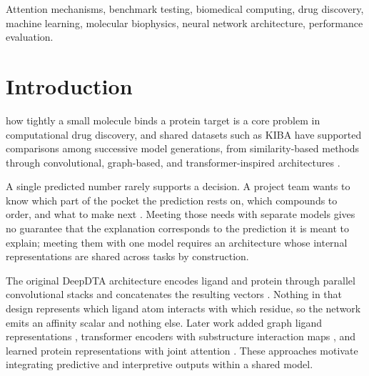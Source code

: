 \documentclass{ieeeaccess}
\begin{document}
\begin{keywords}
\raggedright
Attention mechanisms, benchmark testing, biomedical computing, drug discovery,
machine learning, molecular biophysics, neural network architecture,
performance evaluation.
\end{keywords}

\titlepgskip=-21pt
\maketitle

\section{Introduction}
 how tightly a small molecule binds a protein target
is a core problem in computational drug discovery, and shared datasets such as
KIBA have supported comparisons among successive model generations, from
similarity-based methods through convolutional, graph-based, and
transformer-inspired architectures
\cite{tang2014kiba,he2017simboost,pahikkala2015realistic,ozturk2018deepdta,ozturk2019widedta,karimi2019deepaffinity,tsubaki2019cpi,nguyen2021graphdta,huang2021moltrans,yang2022mgraphdta,huang2022fusiondta,bidgoli2026hmmdta,stepniewska2018pafnucy}.

A single predicted number rarely supports a decision. A project team wants to
know which part of the pocket the prediction rests on, which compounds to order,
and what to make next \cite{schneider2020rethinking}. Meeting those needs with
separate models gives no
guarantee that the explanation corresponds to the prediction it is meant to
explain; meeting them with one model requires an architecture whose internal
representations are shared across tasks by construction.

The original DeepDTA architecture encodes ligand and protein through parallel
convolutional stacks and concatenates the resulting vectors
\cite{ozturk2018deepdta}. Nothing in that design represents which ligand atom
interacts with which residue, so the network emits an affinity scalar and
nothing else. Later work added graph ligand representations
\cite{nguyen2021graphdta,jiang2020dgraphdta,yang2022mgraphdta}, transformer
encoders with substructure interaction maps \cite{huang2021moltrans}, and
learned protein representations with joint attention
\cite{karimi2019deepaffinity}. These approaches motivate integrating predictive
and interpretive outputs within a shared model.
\end{document}
